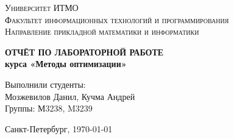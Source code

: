 \documentclass[14pt,a4paper,report]{ncc}
\begin{document}
\begin{titlepage}
\begin{center}
\textsc{Университет ИТМО\\[5mm]
Факультет информационных технологий и программирования\\[2mm]
Направление прикладной математики и информатики}

\vfill

\textbf{ОТЧЁТ ПО ЛАБОРАТОРНОЙ РАБОТЕ \\[3mm]
курса «Методы оптимизации»
\\[20mm]
}
\end{center}

\hfill
\begin{minipage}{.45\textwidth}
Выполнили студенты:\\[2mm]
Мозжевилов Данил, Кучма Андрей\\
Группы: М3238, M3239\\[2mm]

\end{minipage}%
\vfill
\begin{center}
 Санкт-Петербург, \today
\end{center}
\end{titlepage}

\tableofcontents
\newpage


\end{document}
